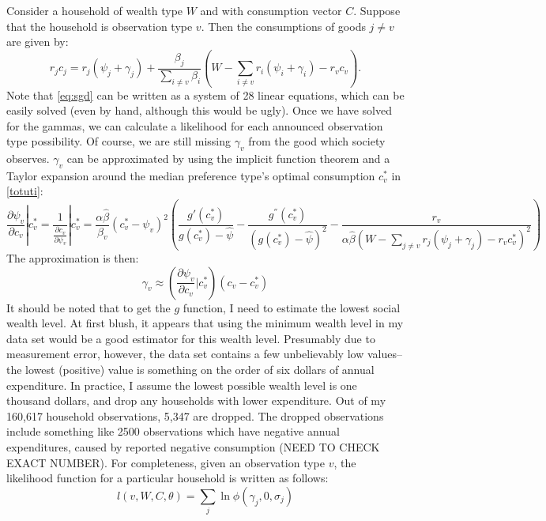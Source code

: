 \documentclass{article}
\begin{document}
Consider a household of wealth type $W$ and with consumption vector $C$.  
Suppose that the household is observation type $v$.
Then the consumptions of goods $j\neq v$ are given by:
\begin{equation}
	\label{eq:sgd}
	r_jc_j = r_j(\psi_j + \gamma_j) + \frac{\beta_j}{\sum_{i\neq v}\beta_i}  \left(W-\sum_{i \neq v} r_i\left(\psi_i + \gamma_i\right) - r_v c_v\right).
\end{equation}
Note that \eqref{eq:sgd} can be written as a system of 28 linear equations, which can be easily solved (even by hand, although this would be ugly).
Once we have solved for the gammas, we can calculate a likelihood for each announced observation type possibility.
Of course, we are still missing $\gamma_v$ from the good which society observes.
$\gamma_v$ can be approximated by using the implicit function theorem and a Taylor expansion around the median preference type's optimal consumption $c_v^*$ in \eqref{totuti}:
\begin{equation}
	\frac{\partial \psi_v}{\partial c_v}|c_v^* = \frac{1}{\frac{\partial c_v}{\partial \psi_v}}|c_v^*=\frac{\alpha \hat{\beta}}{\beta_v}\left(c_v^*-\psi_v\right)^2 \left( \frac{g'(c_v^*)}{g(c_v^*)-\hat{\psi}} - \frac{g^{''}(c_v^*)}{\left(g(c_v^*) -\hat{\psi}\right)^2}-\frac{r_v}{\alpha \hat{\beta}(W-\sum_{j\neq v} r_j (\psi_j + \gamma_j) -r_v c_v^*)^2}\right)
\end{equation}
The approximation is then:
\begin{equation}
	\gamma_v \approx \left(\frac{\partial \psi_v}{\partial c_v}|c_v^*\right)\left(c_v - c_v^*\right)
\end{equation}
It should be noted that to get the $g$ function, I need to estimate the lowest social wealth level. 
At first blush, it appears that using the minimum wealth level in my data set would be a good estimator for this wealth level.
Presumably due to measurement error, however, the data set contains a few unbelievably low values--the lowest (positive) value is something on the order of six dollars of annual expenditure.
In practice, I assume the lowest possible wealth level is one thousand dollars, and drop any households with lower expenditure.
Out of my 160,617 household observations, 5,347 are dropped.
The dropped observations include something like 2500 observations which have negative annual expenditures, caused by reported negative consumption (NEED TO CHECK EXACT NUMBER).
For completeness, given an observation type $v$, the likelihood function for a particular household is written as follows:
\begin{equation}
	\label{lik1}
	l(v,W,C,\theta) = \sum_{j} \ln \phi(\gamma_j,0,\sigma_j)
\end{equation}
\end{document}
